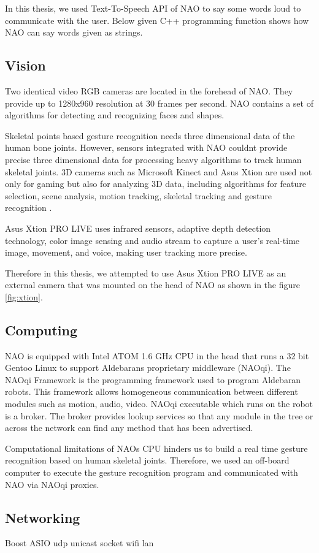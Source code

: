 In this thesis, we used Text-To-Speech API of NAO to say some words loud to communicate with the user.  Below given C++ programming function shows how NAO can say words given as strings.

\subsection{Vision}
Two identical video RGB cameras are located in the forehead of NAO. They provide up to 1280x960 resolution at 30 frames per second. NAO contains a set of algorithms for detecting and recognizing faces and shapes.

Skeletal points based gesture recognition needs three dimensional data of the human bone joints. However, sensors integrated with NAO couldnt provide precise three dimensional data for processing heavy algorithms to track human skeletal joints. 3D cameras such as Microsoft Kinect and Asus Xtion are used not only for gaming but also for analyzing 3D data, including algorithms for feature selection, scene analysis, motion tracking, skeletal tracking and gesture recognition \cite{12}. 

Asus Xtion PRO LIVE uses infrared sensors, adaptive depth detection technology, color image sensing and audio stream to capture a user's real-time image, movement, and voice, making user tracking more precise. 

Therefore in this thesis, we attempted to use Asus Xtion PRO LIVE as an external camera that was mounted on the head of NAO as shown in the figure \ref{fig:xtion}. 

\subsection{Computing}
NAO is equipped with Intel ATOM 1.6 GHz CPU in the head that runs a 32 bit Gentoo Linux to support Aldebarans proprietary middleware (NAOqi). The NAOqi Framework is the programming framework used to program Aldebaran robots. This framework allows homogeneous communication between different modules such as motion, audio, video. NAOqi executable which runs on the robot is a broker. The broker provides lookup services so that any module in the tree or across the network can find any method that has been advertised.

Computational limitations of NAOs CPU hinders us to build a real time gesture recognition based on human skeletal joints. Therefore, we used an off-board computer to execute the gesture recognition program and communicated with NAO via NAOqi proxies. 

\subsection{Networking}
Boost ASIO udp unicast socket wifi lan
